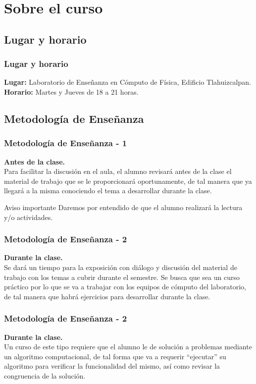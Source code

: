 \documentclass[12pt]{beamer}
\begin{document}
\section{Sobre el curso}
\subsection{Lugar y horario}
\begin{frame}
\frametitle{Lugar y horario} 
\textbf{Lugar: }Laboratorio de Enseñanza en Cómputo de Física, Edificio Tlahuizcalpan.
\\
\bigskip
\textbf{Horario: } Martes y Jueves de 18 a 21 horas.
\end{frame}
\subsection{Metodología de Enseñanza}
\begin{frame}
\frametitle{Metodología de Enseñanza - 1}
\textbf{Antes de la clase.}
\\
\vspace{0.5em}
Para facilitar la discusión en el aula, el alumno revisará antes de la clase el material de trabajo que se le proporcionará oportunamente, de tal manera que ya llegará a la misma conociendo el tema a desarrollar durante la clase.
\\
\bigskip
\pause
\begin{alertblock}{Aviso importante}
Daremos por entendido de que el alumno realizará la lectura y/o actividades.
\end{alertblock}
\end{frame}
\begin{frame} 
\frametitle{Metodología de Enseñanza - 2}
\textbf{Durante la clase.}
\\
\vspace{0.5em}
Se dará un tiempo para la exposición con diálogo y discusión del material de trabajo con los temas a cubrir durante el semestre. Se busca que sea un curso práctico por lo que se va a trabajar con los equipos de cómputo del laboratorio, de tal manera que habrá ejercicios para desarrollar durante la clase.
\end{frame}
\begin{frame} 
\frametitle{Metodología de Enseñanza - 2}
\textbf{Durante la clase.}
\\
\vspace{0.5em}
Un curso de este tipo requiere que el alumno le de solución a problemas mediante un algoritmo computacional, de tal forma que va a requerir \enquote{ejecutar} su algoritmo para verificar la funcionalidad del mismo, así como revisar la congruencia de la solución.
\end{frame}
\end{document}

